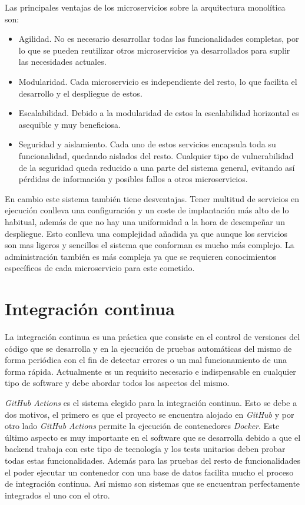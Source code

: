 Las principales ventajas de los microservicios sobre la arquitectura monolítica son:
\begin{itemize}
	\item Agilidad. No es necesario desarrollar todas las funcionalidades completas, por lo que se pueden reutilizar otros microservicios ya desarrollados para suplir las necesidades actuales.
	\item Modularidad. Cada microservicio es independiente del resto, lo que facilita el desarrollo y el despliegue de estos.
	\item Escalabilidad. Debido a la modularidad de estos la escalabilidad horizontal es asequible y muy beneficiosa.
	\item Seguridad y aislamiento. Cada uno de estos servicios encapsula toda su funcionalidad, quedando aislados del resto. Cualquier tipo de vulnerabilidad de la seguridad queda reducido a una parte del sistema general, evitando así pérdidas de información y posibles fallos a otros microservicios.
\end{itemize}

En cambio este sistema también tiene desventajas. Tener multitud de servicios en ejecución conlleva una configuración y un coste de implantación más alto de lo habitual, además de que no hay una uniformidad a la hora de desempeñar un despliegue. Esto conlleva una complejidad añadida ya que aunque los servicios son mas ligeros y sencillos el sistema que conforman es mucho más complejo. La administración también es más compleja ya que se requieren conocimientos específicos de cada microservicio para este cometido.


\section{Integración continua}

La integración continua es una práctica que consiste en el control de versiones del código que se desarrolla y en la ejecución de pruebas automáticas del mismo de forma periódica con el fin de detectar errores o un mal funcionamiento de una forma rápida. Actualmente es un requisito necesario e indispensable en cualquier tipo de software y debe abordar todos los aspectos del mismo.

\textit{GitHub Actions} es el sistema elegido para la integración continua. Esto se debe a dos motivos, el primero es que el proyecto se encuentra alojado en \textit{GitHub} y por otro lado \textit{GitHub Actions} permite la ejecución de contenedores \textit{Docker}. Este último aspecto es muy importante en el software que se desarrolla debido a que el backend trabaja con este tipo de tecnología y los tests unitarios deben probar todas estas funcionalidades. Además para las pruebas del resto de funcionalidades el poder ejecutar un contenedor con una base de datos facilita mucho el proceso de integración continua. Así mismo son sistemas que se encuentran perfectamente integrados el uno con el otro.

